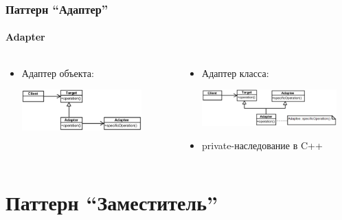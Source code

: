 \documentclass{../cscslides}
\begin{document}
    \begin{frame}
        \frametitle{Паттерн ``Адаптер''}
        \framesubtitle{Adapter}
        \begin{columns}
            \begin{column}{0.5\textwidth}
                \begin{itemize}
                    \item Адаптер объекта:
                        \vspace{0.3cm}
                        
                        \includegraphics[width=0.8\textwidth]{objectAdapter.png}
                \end{itemize}
            \end{column}
            \begin{column}{0.5\textwidth}
                \begin{itemize}
                    \item Адаптер класса:
                        \vspace{0.3cm}
                        
                        \includegraphics[width=0.9\textwidth]{classAdapter.png}
                        \vspace{0.3cm}
                    \item private-наследование в C++
                \end{itemize}
            \end{column}
        \end{columns}
    \end{frame}

    \section{Паттерн ``Заместитель''}
\end{document}
